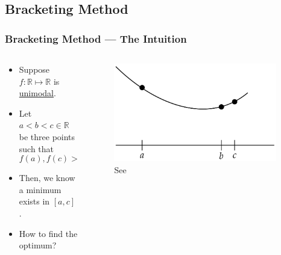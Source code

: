 \documentclass[11pt,xcolor={svgnames},aspectratio=169,usepdftitle=false,notheorems]{beamer}
\begin{document}
\subsection{Bracketing Method}

\begin{frame}
  \frametitle{Bracketing Method --- The Intuition}
  \begin{columns}
  \begin{column}{0.49\textwidth}
    \begin{itemize}
      \item Suppose $f : \mathbb{R}\mapsto\mathbb{R}$ is \href{https://en.wikipedia.org/wiki/Unimodality\#Unimodal_function}{unimodal}.
      \item Let $a<b<c\in\mathbb{R}$ be three points such that
      \begin{equation}
        f(a), f(c) > f(b) \label{eqn:bracketing_criterion}
      \end{equation}
      \item Then, we know a minimum exists in $[a,c]$.
      \item How to find the optimum?
    \end{itemize}
  \end{column}
  \begin{column}{0.5\textwidth}
    \begin{figure}
      \includegraphics[width=0.95\textwidth]{../figures/optimization_bracketing.png}
      \caption{See \cite{kochenderfer2019optimization}}
    \end{figure}
  \end{column}
\end{columns}
\end{frame}
\end{document}
